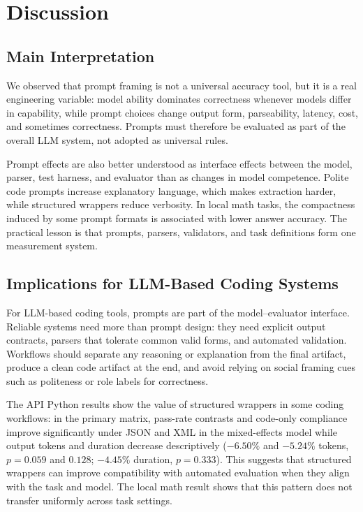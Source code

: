 \documentclass[a4paper,fleqn]{cas-sc}
\begin{document}
\section{Discussion}\label{sec:discussion}
\subsection{Main Interpretation}\label{main-interpretation}

We observed that prompt framing is not a universal accuracy tool, but it is a real engineering variable: model ability dominates correctness whenever models differ in capability, while prompt choices change output form, parseability, latency, cost, and sometimes correctness. Prompts must therefore be evaluated as part of the overall LLM system, not adopted as universal rules.

Prompt effects are also better understood as interface effects between the model, parser, test harness, and evaluator than as changes in model competence. Polite code prompts increase explanatory language, which makes extraction harder, while structured wrappers reduce verbosity. In local math tasks, the compactness induced by some prompt formats is associated with lower answer accuracy. The practical lesson is that prompts, parsers, validators, and task definitions form one measurement system.

\subsection{Implications for LLM-Based Coding Systems}\label{implications-for-llm-based-coding-systems}

For LLM-based coding tools, prompts are part of the model--evaluator interface. Reliable systems need more than prompt design: they need explicit output contracts, parsers that tolerate common valid forms, and automated validation. Workflows should separate any reasoning or explanation from the final artifact, produce a clean code artifact at the end, and avoid relying on social framing cues such as politeness or role labels for correctness.

The API Python results show the value of structured wrappers in some coding workflows: in the primary matrix, pass-rate contrasts and code-only compliance improve significantly under JSON and XML in the mixed-effects model while output tokens and duration decrease descriptively ($-6.50\%$ and $-5.24\%$ tokens, $p = 0.059$ and $0.128$; $-4.45\%$ duration, $p = 0.333$). This suggests that structured wrappers can improve compatibility with automated evaluation when they align with the task and model. The local math result shows that this pattern does not transfer uniformly across task settings.
\end{document}
